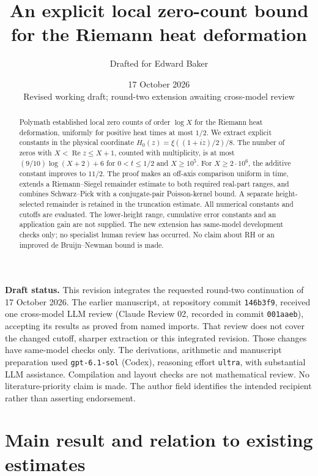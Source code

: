 \documentclass[11pt]{article}
\title{An explicit local zero-count bound\\for the Riemann heat deformation}
\author{Drafted for Edward Baker}
\date{17 October 2026\\\small Revised working draft; round-two extension awaiting cross-model review}
\theoremstyle{remark}
\numberwithin{equation}{section}
\begin{document}
\maketitle
\begin{abstract}
Polymath established local zero counts of order $\log X$ for the Riemann
heat deformation, uniformly for positive heat times at most $1/2$.
We extract explicit constants in the physical coordinate
$H_0(z)=\xi((1+iz)/2)/8$. The number of zeros with
$X<\operatorname{Re}z\le X+1$, counted with multiplicity, is at most
$(9/10)\log(X+2)+6$ for $0<t\le1/2$ and $X\ge10^5$.
For $X\ge2\cdot10^6$, the additive constant improves to $11/2$.
The proof makes an off-axis comparison uniform in time, extends a
Riemann--Siegel remainder estimate to both required real-part ranges,
and combines Schwarz--Pick with a conjugate-pair Poisson-kernel bound.
A separate height-selected remainder is retained in the truncation
estimate. All numerical constants and cutoffs are evaluated. The
lower-height range, cumulative error constants and an application gain
are not supplied. The new extension has same-model development checks
only; no specialist human review has occurred. No claim about RH or an
improved de Bruijn--Newman bound is made.
\end{abstract}

\noindent\textbf{Draft status.}
This revision integrates the requested round-two continuation of
17 October 2026. The earlier manuscript, at repository commit
\texttt{146b3f9}, received one cross-model LLM review (Claude Review 02,
recorded in commit \texttt{001aaeb}), accepting its results as proved from
named imports. That review does not cover the changed cutoff, sharper
extraction or this integrated revision. Those changes have same-model
checks only. The derivations, arithmetic and manuscript preparation used
\texttt{gpt-6.1-sol} (Codex), reasoning effort \texttt{ultra}, with
substantial LLM assistance. Compilation and layout checks are not
mathematical review. No literature-priority claim is made. The author
field identifies the intended recipient rather than asserting endorsement.

\section{Main result and relation to existing estimates}\label{sec:main}
\end{document}
